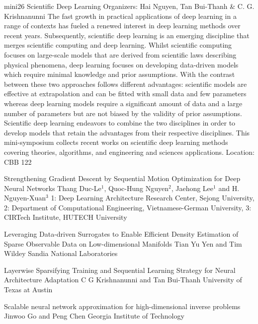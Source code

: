 \mini
{mini26}
{Scientific Deep Learning}
{Organizers: Hai Nguyen, Tan Bui-Thanh \& C. G. Krishnanunni}
{The fast growth in practical applications of deep learning in a range of contexts has fueled a renewed interest in deep learning methods over recent years. Subsequently, scientific deep learning is an emerging discipline that merges scientific computing and deep learning. Whilst scientific computing focuses on large-scale models that are derived from scientific laws describing physical phenomena, deep learning focuses on developing data-driven models which require minimal knowledge and prior assumptions. With the contrast between these two approaches follows different advantages: scientific models are effective at extrapolation and can be fitted with small data and few parameters whereas deep learning models require a significant amount of data and a large number of parameters but are not biased by the validity of prior assumptions. Scientific deep learning endeavors to combine the two disciplines in order to develop models that retain the advantages from their respective disciplines. This mini-symposium collects recent works on scientific deep learning methods covering theories, algorithms, and engineering and sciences applications.}
{Location: CBB 122}

\begin{talks}
\item\talk
{Strengthening Gradient Descent by Sequential Motion Optimization for Deep Neural Networks}
{Thang Duc-Le$^{1}$, Quoc-Hung Nguyen$^{2}$, Jaehong Lee$^{1}$ and H. Nguyen-Xuan$^{3}$}
{1: Deep Learning Architecture Research Center, Sejong University, 2: Department of Computational Engineering, Vietnamese-German University, 3: CIRTech Institute, HUTECH University}
\item\talk
{Leveraging Data-driven Surrogates to Enable Efficient Density Estimation of Sparse Observable Data on Low-dimensional Manifolds}
{Tian Yu Yen and Tim Wildey}
{Sandia National Laboratories}
\item\talk
{Layerwise Sparsifying Training and Sequential Learning Strategy for Neural Architecture Adaptation}
{C G Krishnanunni and Tan Bui-Thanh}
{University of Texas at Austin}
\item\talk
{Scalable neural network approximation for high-dimensional inverse problems}
{Jinwoo Go and Peng Chen}
{Georgia Institute of Technology}
\end{talks}
\room
